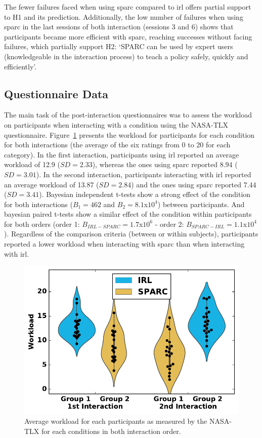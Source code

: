 The fewer failures faced when using \gls{sparc} compared to \gls{irl} offers partial support to H1 and its prediction. Additionally, the low number of failures when using \gls{sparc} in the last sessions of both interaction (sessions 3 and 6) shows that participants became more efficient with \gls{sparc}, reaching successes without facing failures, which partially support H2: `SPARC can be used by expert users (knowledgeable in the interaction process) to teach a policy safely, quickly and efficiently'.

\subsection{Questionnaire Data}

The main task of the post-interaction questionnaires was to assess the workload on participants when interacting with a condition using the NASA-TLX questionnaire. Figure~\ref{fig:control_workload} presents the workload for participants for each condition for both interactions (the average of the six ratings from 0 to 20 for each category). In the first interaction, participants using \gls{irl} reported an average workload of 12.9 ($SD=2.33$), whereas the ones using \gls{sparc} reported 8.94 ($SD=3.01$). In the second interaction, participants interacting with \gls{irl} reported an average workload of 13.87 ($SD=2.84$) and the ones using \gls{sparc} reported 7.44 ($SD=3.41$). Bayesian independent t-tests show a strong effect of the condition for both interactions ($B_1=462$ and $B_2=8.1$x$10^4$) between participants. And bayesian paired t-tests show a similar effect of the condition within participants for both orders (order 1: $B_{IRL-SPARC}=1.7$x$10^6$ - order 2: $B_{SPARC-IRL}=1.1$x$10^4$). Regardless of the comparison criteria (between or within subjects), participants reported a lower workload when interacting with \gls{sparc} than when interacting with \gls{irl}.

\begin{figure}[ht]
	\includegraphics[width=.8\textwidth]{workload.pdf}
	\centering
	\caption{Average workload for each participants as measured by the NASA-TLX for each conditions in both interaction order.
	}
	\label{fig:control_workload}
\end{figure}

